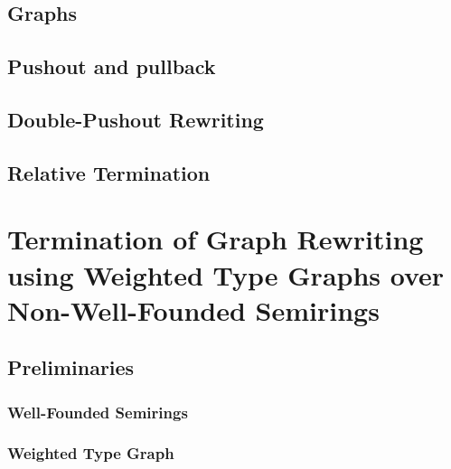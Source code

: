 \documentclass{report}
\begin{document}

\section{Graphs}
 
\section{Pushout and pullback}  

\section{Double-Pushout Rewriting}
 
\section{Relative Termination}



\chapter{Termination of Graph Rewriting using Weighted Type Graphs over Non-Well-Founded Semirings} 
\label{chap:nwf}



\section{Preliminaries}

\subsection{Well-Founded Semirings} 
\label{sec:well_founded_semiring}

 
\subsection{Weighted Type Graph} 
\label{sec:weighted_type_graph}

\end{document}
